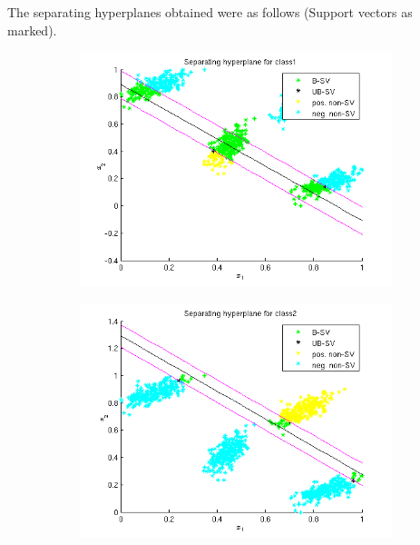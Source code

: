 \documentclass{article}
\begin{document}
The separating hyperplanes obtained were as follows (Support vectors as marked).
\begin{figure}
\begin{subfigure}{.5\textwidth}
  \centering
  \includegraphics[width=.8\linewidth]{Classification/1a/c_linear/hc1}
 
\end{subfigure}%
\begin{subfigure}{.5\textwidth}
  \centering
  \includegraphics[width=.8\linewidth]{Classification/1a/c_linear/hc2}
  
\end{subfigure}
\end{figure}
\end{document}
